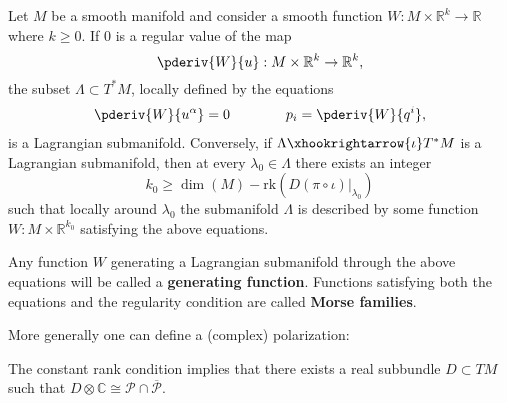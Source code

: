     \begin{theorem}\label{symplectic:maslow_hormander}
        Let $M$ be a smooth manifold and consider a smooth function $W:M\times\mathbb{R}^k\rightarrow\mathbb{R}$ where $k\geq 0$. If 0 is a regular value of the map \[\pderiv{W}{u}:M\times\mathbb{R}^k\rightarrow\mathbb{R}^k,\] the subset $\Lambda\subset T^*M$, locally defined by the equations
        \begin{gather}
            \pderiv{W}{u^\alpha} = 0\qquad\qquad p_i=\pderiv{W}{q^i},
        \end{gather}
        is a Lagrangian submanifold. Conversely, if $\Lambda\xhookrightarrow{\iota}T^*M$ is a Lagrangian submanifold, then at every $\lambda_0\in\Lambda$ there exists an integer \[k_0\geq\dim(M) - \text{rk}\left(D(\pi\circ\iota)|_{\lambda_0}\right)\] such that locally around $\lambda_0$ the submanifold $\Lambda$ is described by some function $W:M\times\mathbb{R}^{k_0}$ satisfying the above equations.
    \end{theorem}
    Any function $W$ generating a Lagrangian submanifold through the above equations will be called a \textbf{generating function}. Functions satisfying both the equations and the regularity condition are called \textbf{Morse families}.

    More generally one can define a (complex) polarization:
    \begin{remark}
        The constant rank condition implies that there exists a real subbundle $D\subset TM$ such that $D\otimes\mathbb{C}\cong\mathcal{P}\cap\overline{\mathcal{P}}$.
    \end{remark}

